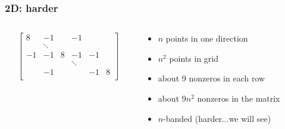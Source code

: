 \documentclass[10pt]{beamer}
\begin{document}
\begin{frame}
\frametitle{2D: harder}
\begin{columns}
  \begin{column}{0.48\textwidth}
  \end{column}
  \begin{column}{0.48\textwidth}
  \end{column}
\end{columns}
\begin{columns}
  \begin{column}{0.48\textwidth}
  \begin{equation*}
  \begin{bmatrix}
    8&-1      &   &     -1  &      & \\
     & \ddots &   &         &      & \\
     -1& -1     & 8 & -1      & -1   & \\
     &        &   & \ddots &      & \\
     &   -1   &   &        & -1   & 8\\
  \end{bmatrix}
  \end{equation*}
  \end{column}
  \begin{column}{0.48\textwidth}
  \begin{itemize}
  \item $n$ points in one direction
  \item $n^2$ points in grid
  \item about 9 nonzeros in each row
  \item about $9n^2$ nonzeros in the matrix
  \item $n$-banded (harder...we will see)
  \end{itemize}
  \end{column}
\end{columns}
\end{frame}
\end{document}
